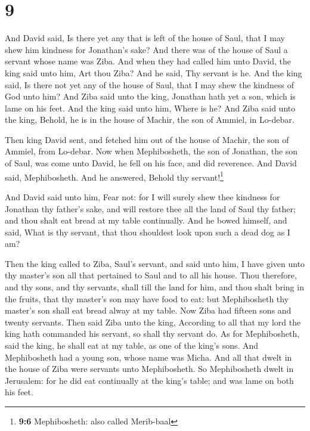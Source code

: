 \hypertarget{section-8}{%
\section{9}\label{section-8}}

 And David said, Is there yet any that is left of the
house of Saul, that I may shew him kindness for Jonathan's sake?
 And there was of the house of Saul a servant whose name
was Ziba. And when they had called him unto David, the king said unto
him, Art thou Ziba? And he said, Thy servant is he.  And
the king said, Is there not yet any of the house of Saul, that I may
shew the kindness of God unto him? And Ziba said unto the king, Jonathan
hath yet a son, which is lame on his feet.  And the king
said unto him, Where is he? And Ziba said unto the king, Behold, he is
in the house of Machir, the son of Ammiel, in Lo-debar.

 Then king David sent, and fetched him out of the house of
Machir, the son of Ammiel, from Lo-debar.  Now when
Mephibosheth, the son of Jonathan, the son of Saul, was come unto David,
he fell on his face, and did reverence. And David said, Mephibosheth.
And he answered, Behold thy servant!\footnote{\textbf{9:6} Mephibosheth:
  also called Merib-baal}

 And David said unto him, Fear not: for I will surely shew
thee kindness for Jonathan thy father's sake, and will restore thee all
the land of Saul thy father; and thou shalt eat bread at my table
continually.  And he bowed himself, and said, What is thy
servant, that thou shouldest look upon such a dead dog as I am?

 Then the king called to Ziba, Saul's servant, and said
unto him, I have given unto thy master's son all that pertained to Saul
and to all his house.  Thou therefore, and thy sons, and
thy servants, shall till the land for him, and thou shalt bring in the
fruits, that thy master's son may have food to eat: but Mephibosheth thy
master's son shall eat bread alway at my table. Now Ziba had fifteen
sons and twenty servants.  Then said Ziba unto the king,
According to all that my lord the king hath commanded his servant, so
shall thy servant do. As for Mephibosheth, said the king, he shall eat
at my table, as one of the king's sons.  And Mephibosheth
had a young son, whose name was Micha. And all that dwelt in the house
of Ziba were servants unto Mephibosheth.  So Mephibosheth
dwelt in Jerusalem: for he did eat continually at the king's table; and
was lame on both his feet.

